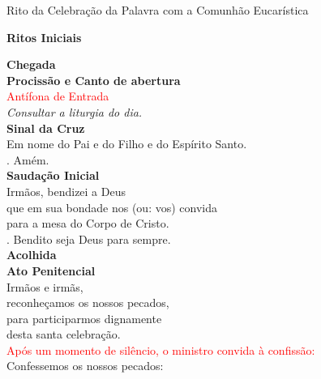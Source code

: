 \documentclass{book}
\begin{document}
\pagestyle{empty}
\begin{center}
    \large Rito da Celebração da Palavra com a Comunhão Eucarística
\end{center}
\begin{center}
    \textbf{Ritos Iniciais}
\end{center}
\begin{flushleft}
    \textbf{Chegada}
    \vspace{.2cm} \\
    \textbf{Procissão e Canto de abertura}
    \vspace{.2cm} \\
    \textcolor{red}{Antífona de Entrada} \\
    \textit{Consultar a liturgia do dia.}
    \vspace{.2cm} \\
    \textbf{Sinal da Cruz}
    \vspace{.2cm} \\
    Em nome do Pai e do Filho e do Espírito Santo. \\
    {\color{red} \Rbar.} Amém.
    \vspace{.2cm} \\
    \textbf{Saudação Inicial}
    \vspace{.2cm} \\
    Irmãos, bendizei a Deus \\
    que em sua bondade nos (ou: vos) convida \\
    para a mesa do Corpo de Cristo. \\
    {\color{red} \Rbar.} Bendito seja Deus para sempre.
    \vspace{.2cm} \\
    \textbf{Acolhida}
    \vspace{.2cm} \\
    \textbf{Ato Penitencial}
    \vspace{.2cm} \\
    Irmãos e irmãs, \\
    reconheçamos os nossos pecados, \\
    para participarmos dignamente \\
    desta santa celebração.
    \vspace{.1cm} \\
    \textcolor{red}{Após um momento de silêncio, o ministro convida à confissão:}
    \vspace{.1cm} \\
    Confessemos os nossos pecados:
    \vspace{.1cm} \\

\end{flushleft}
\end{document}
